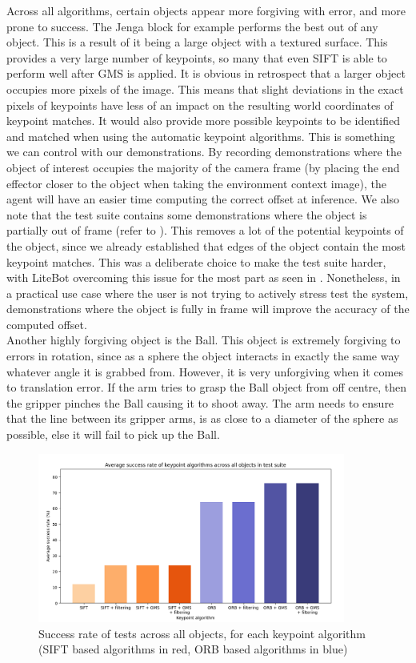 Across all algorithms, certain objects appear more forgiving with error, and more prone to success. The Jenga block for example performs the best out of any object. This is a result of it being a large object with a textured surface. This provides a very large number of keypoints, so many that even SIFT is able to perform well after GMS is applied. It is obvious in retrospect that a larger object occupies more pixels of the image. This means that slight deviations in the exact pixels of keypoints have less of an impact on the resulting world coordinates of keypoint matches. It would also provide more possible keypoints to be identified and matched when using the automatic keypoint algorithms. This is something we can control with our demonstrations. By recording demonstrations where the object of interest occupies the majority of the camera frame (by placing the end effector closer to the object when taking the environment context image), the agent will have an easier time computing the correct offset at inference. We also note that the test suite contains some demonstrations where the object is partially out of frame (refer to ). This removes a lot of the potential keypoints of the object, since we already established that edges of the object contain the most keypoint matches. This was a deliberate choice to make the test suite harder, with LiteBot overcoming this issue for the most part as seen in . Nonetheless, in a practical use case where the user is not trying to actively stress test the system, demonstrations where the object is fully in frame will improve the accuracy of the computed offset.\\

Another highly forgiving object is the Ball. This object is extremely forgiving to errors in rotation, since as a sphere the object interacts in exactly the same way whatever angle it is grabbed from. However, it is very unforgiving when it comes to translation error. If the arm tries to grasp the Ball object from off centre, then the gripper pinches the Ball causing it to shoot away. The arm needs to ensure that the line between its gripper arms, is as close to a diameter of the sphere as possible, else it will fail to pick up the Ball.

\begin{figure}[h]
    \centering
    \includegraphics[width=0.9\textwidth]{figures/barchart.png}
    \caption{Success rate of tests across all objects, for each keypoint algorithm (SIFT based algorithms in red, ORB based algorithms in blue)}
    \label{fig:barchart}
\end{figure}

